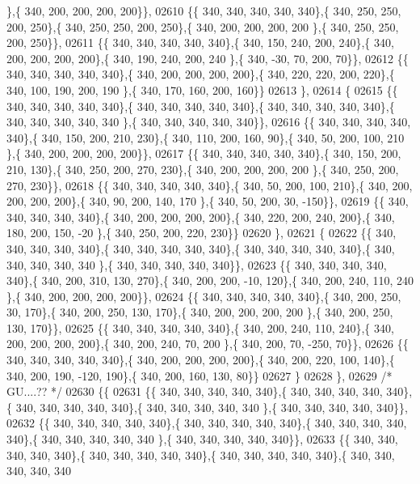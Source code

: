 \begin{DoxyCode}
      \},\{ 340, 200, 200, 200, 200\}\},
02610 \{\{ 340, 340, 340, 340, 340\},\{ 340, 250, 250, 200, 250\},\{ 340, 250, 250, 200, 250\},\{ 340, 200, 200, 200, 200
      \},\{ 340, 250, 250, 200, 250\}\},
02611 \{\{ 340, 340, 340, 340, 340\},\{ 340, 150, 240, 200, 240\},\{ 340, 200, 200, 200, 200\},\{ 340, 190, 240, 200, 240
      \},\{ 340, -30,  70, 200,  70\}\},
02612 \{\{ 340, 340, 340, 340, 340\},\{ 340, 200, 200, 200, 200\},\{ 340, 220, 220, 200, 220\},\{ 340, 100, 190, 200, 190
      \},\{ 340, 170, 160, 200, 160\}\}
02613 \},
02614 \{
02615 \{\{ 340, 340, 340, 340, 340\},\{ 340, 340, 340, 340, 340\},\{ 340, 340, 340, 340, 340\},\{ 340, 340, 340, 340, 340
      \},\{ 340, 340, 340, 340, 340\}\},
02616 \{\{ 340, 340, 340, 340, 340\},\{ 340, 150, 200, 210, 230\},\{ 340, 110, 200, 160,  90\},\{ 340,  50, 200, 100, 210
      \},\{ 340, 200, 200, 200, 200\}\},
02617 \{\{ 340, 340, 340, 340, 340\},\{ 340, 150, 200, 210, 130\},\{ 340, 250, 200, 270, 230\},\{ 340, 200, 200, 200, 200
      \},\{ 340, 250, 200, 270, 230\}\},
02618 \{\{ 340, 340, 340, 340, 340\},\{ 340,  50, 200, 100, 210\},\{ 340, 200, 200, 200, 200\},\{ 340,  90, 200, 140, 170
      \},\{ 340,  50, 200,  30, -150\}\},
02619 \{\{ 340, 340, 340, 340, 340\},\{ 340, 200, 200, 200, 200\},\{ 340, 220, 200, 240, 200\},\{ 340, 180, 200, 150, -20
      \},\{ 340, 250, 200, 220, 230\}\}
02620 \},
02621 \{
02622 \{\{ 340, 340, 340, 340, 340\},\{ 340, 340, 340, 340, 340\},\{ 340, 340, 340, 340, 340\},\{ 340, 340, 340, 340, 340
      \},\{ 340, 340, 340, 340, 340\}\},
02623 \{\{ 340, 340, 340, 340, 340\},\{ 340, 200, 310, 130, 270\},\{ 340, 200, 200, -10, 120\},\{ 340, 200, 240, 110, 240
      \},\{ 340, 200, 200, 200, 200\}\},
02624 \{\{ 340, 340, 340, 340, 340\},\{ 340, 200, 250,  30, 170\},\{ 340, 200, 250, 130, 170\},\{ 340, 200, 200, 200, 200
      \},\{ 340, 200, 250, 130, 170\}\},
02625 \{\{ 340, 340, 340, 340, 340\},\{ 340, 200, 240, 110, 240\},\{ 340, 200, 200, 200, 200\},\{ 340, 200, 240,  70, 200
      \},\{ 340, 200,  70, -250,  70\}\},
02626 \{\{ 340, 340, 340, 340, 340\},\{ 340, 200, 200, 200, 200\},\{ 340, 200, 220, 100, 140\},\{ 340, 200, 190, -120, 
      190\},\{ 340, 200, 160, 130,  80\}\}
02627 \}
02628 \},
02629 \textcolor{comment}{/* GU....?? */}
02630 \{\{
02631 \{\{ 340, 340, 340, 340, 340\},\{ 340, 340, 340, 340, 340\},\{ 340, 340, 340, 340, 340\},\{ 340, 340, 340, 340, 340
      \},\{ 340, 340, 340, 340, 340\}\},
02632 \{\{ 340, 340, 340, 340, 340\},\{ 340, 340, 340, 340, 340\},\{ 340, 340, 340, 340, 340\},\{ 340, 340, 340, 340, 340
      \},\{ 340, 340, 340, 340, 340\}\},
02633 \{\{ 340, 340, 340, 340, 340\},\{ 340, 340, 340, 340, 340\},\{ 340, 340, 340, 340, 340\},\{ 340, 340, 340, 340, 340

\end{DoxyCode}
